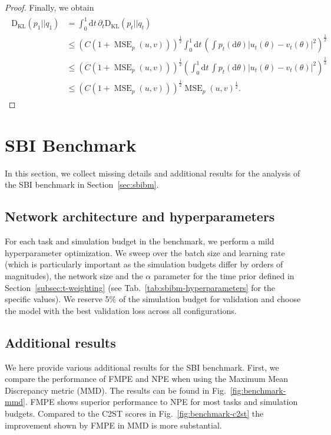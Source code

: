 \documentclass{article}
\theoremstyle{remark}
\renewcommand{\d}{\mathrm{d}}
\newcommand{\KL}{\mathrm{D_{KL}}}
\DeclareMathOperator{\MSE}{MSE}
\begin{document}
\begin{proof}
Finally, we obtain
\begin{align}
\begin{split}
    \KL(p_1||q_1) 
    &=\int_0^1 
    \d t\,
    \partial_t \KL(p_t||q_t)
   \\
    &\leq (C(1+\MSE_p(u,v)))^{\frac12}
    \int_0^1\d t\,  \left(\int p_t(\d \theta)
    |u_t(\theta)-v_t(\theta)|^2\right)^{\frac12} 
    \\
    &\leq 
    (C(1+\MSE_p(u,v)))^{\frac12}
   \left( \int_0^1\d t\,  \int p_t(\d \theta)
    |u_t(\theta)-v_t(\theta)|^2\right)^{\frac12} 
    \\
    &\leq 
    (C(1+\MSE_p(u,v)))^{\frac12} \MSE_p(u,v)^{\frac12}.
    \end{split}
\end{align}
\end{proof}
\section{SBI Benchmark}
\label{sec:appendix-sbibm}
In this section, we collect missing details and additional results for the analysis of the SBI benchmark in Section~\ref{sec:sbibm}.
\subsection{Network architecture and hyperparameters}
For each task and simulation budget in the benchmark, we perform a mild hyperparameter optimization. We sweep over the batch size and learning rate (which is particularly important as the simulation budgets differ by orders of magnitudes), the network size and the $\alpha$ parameter for the time prior defined in Section~\ref{subsec:t-weighting} (see Tab.~\ref{tab:sbibm-hyperparameters} for the specific values). We reserve 5\% of the simulation budget for validation and choose the model with the best validation loss across all configurations.

\subsection{Additional results}
We here provide various additional results for the SBI benchmark. First, we compare the performance of FMPE and NPE when using the Maximum Mean Discrepancy metric (MMD). The results can be found in Fig.~\ref{fig:benchmark-mmd}. FMPE shows superior performance to NPE for most tasks and simulation budgets. Compared to the C2ST scores in Fig.~\ref{fig:benchmark-c2st} the improvement shown by FMPE in MMD is more substantial.
\end{document}
